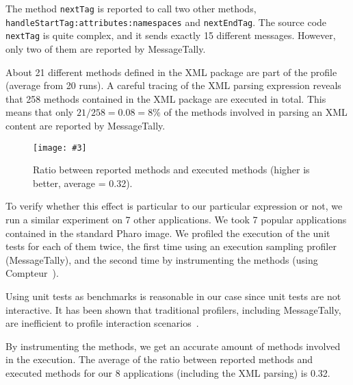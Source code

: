 \documentclass{sig-alternate}
\newcommand{\ct}{\lstinline[backgroundcolor=\color{white},basicstyle=\footnotesize\ttfamily]}
\newcommand{\fig}[4]{
	\begin{figure}[#1]
		\centering
		\texttt{[image: \#3]}
		\caption{\label{fig:#3}#4}
	\end{figure}}
\begin{document}
The method \ct{nextTag} is reported to call two other methods, \ct{handleStartTag:attributes:namespaces} and \ct{nextEndTag}. The source code \ct{nextTag} is quite complex, and it sends exactly 15 different messages. However, only two of them are reported by MessageTally.

About 21 different methods defined in the XML package are part of the profile (average from 20 runs). A careful tracing of the XML parsing expression reveals that 258 methods contained in the XML package are executed in total. This means that only $21 / 258 = 0.08 = 8\%$ of the methods involved in parsing an XML content are reported by MessageTally. 


		

\fig{h}{0.5}{Ratio}{Ratio between reported methods and executed methods (higher is better, average = 0.32).}

To verify whether this effect is particular to our particular expression or not, we run a similar experiment on 7 other applications.
We took 7 popular applications contained in the standard Pharo image. We profiled the execution of the unit tests for each of them twice, the first time using an execution sampling profiler (MessageTally), and the second time by instrumenting the methods (using Compteur~\cite{Berg11d}).

Using unit tests as benchmarks is reasonable in our case since unit tests are not interactive. It has been shown that traditional profilers, including MessageTally, are inefficient to profile interaction scenarios~\cite{Jovi11a}.

By instrumenting the methods, we get an accurate amount of methods involved in the execution. The average of the ratio between reported methods and executed methods for our 8 applications (including the XML parsing) is 0.32. 
\end{document}

